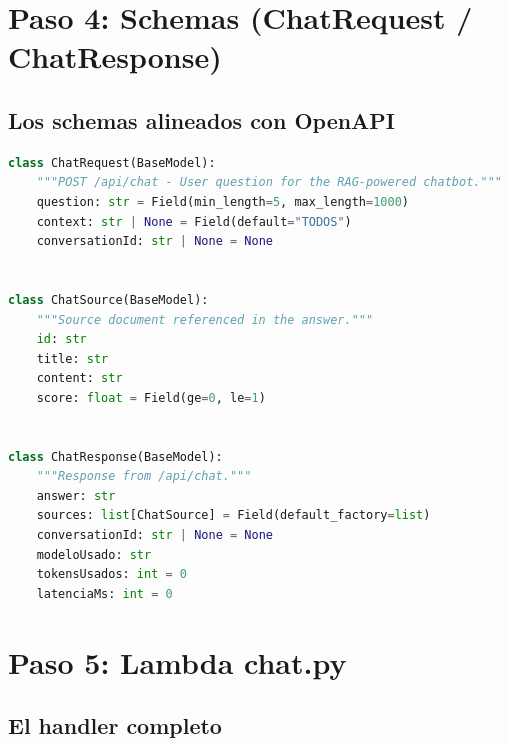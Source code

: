 \documentclass[11pt,a4paper,oneside]{article}
\begin{document}
\section{Paso 4: Schemas (ChatRequest / ChatResponse)}

\subsection{Los schemas alineados con OpenAPI}

\begin{lstlisting}[language=Python,caption={src/handlers/\_shared/schemas.py}]
class ChatRequest(BaseModel):
    """POST /api/chat - User question for the RAG-powered chatbot."""
    question: str = Field(min_length=5, max_length=1000)
    context: str | None = Field(default="TODOS")
    conversationId: str | None = None


class ChatSource(BaseModel):
    """Source document referenced in the answer."""
    id: str
    title: str
    content: str
    score: float = Field(ge=0, le=1)


class ChatResponse(BaseModel):
    """Response from /api/chat."""
    answer: str
    sources: list[ChatSource] = Field(default_factory=list)
    conversationId: str | None = None
    modeloUsado: str
    tokensUsados: int = 0
    latenciaMs: int = 0
\end{lstlisting}

\section{Paso 5: Lambda chat.py}

\subsection{El handler completo}
\end{document}
